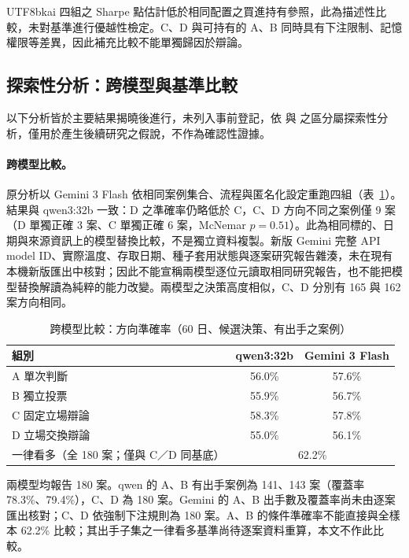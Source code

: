\documentclass[12pt,a4paper]{article}
\newcommand{\grp}[1]{\textsf{#1}}
\begin{document}
\begin{CJK}{UTF8}{bkai}
四組之 Sharpe 點估計低於相同配置之買進持有參照，此為描述性比較，未對基準進行優越性檢定。\grp{C}、\grp{D} 與可持有的 \grp{A}、\grp{B} 同時具有下注限制、記憶權限等差異，因此補充比較不能單獨歸因於辯論。

\subsection{探索性分析：跨模型與基準比較}
\label{sec:exploratory}

以下分析皆於主要結果揭曉後進行，未列入事前登記，依 \citet{wagenmakers2012agenda} 與 \citet{nosek2018prereg} 之區分屬探索性分析，僅用於產生後續研究之假說，不作為確認性證據。

\paragraph{跨模型比較。} 原分析以 Gemini 3 Flash 依相同案例集合、流程與匿名化設定重跑四組（表~\ref{tab:flash}）。結果與 qwen3:32b 一致：\grp{D} 之準確率仍略低於 \grp{C}，\grp{C}、\grp{D} 方向不同之案例僅 9 案（\grp{D} 單獨正確 3 案、\grp{C} 單獨正確 6 案，McNemar $p=0.51$）。此為相同標的、日期與來源資訊上的模型替換比較，不是獨立資料複製。新版 Gemini 完整 API model ID、實際溫度、存取日期、種子套用狀態與逐案研究報告雜湊，未在現有本機新版匯出中核對；因此不能宣稱兩模型逐位元讀取相同研究報告，也不能把模型替換解讀為純粹的能力改變。兩模型之決策高度相似，\grp{C}、\grp{D} 分別有 165 與 162 案方向相同。

\begin{table}[H]
\centering\small
\caption{跨模型比較：方向準確率（60 日、候選決策、有出手之案例）}
\label{tab:flash}
\begin{tabular}{@{}lcc@{}}
\toprule
組別 & qwen3:32b & Gemini 3 Flash \\
\midrule
\grp{A} 單次判斷 & 56.0\% & 57.6\% \\
\grp{B} 獨立投票 & 55.9\% & 56.7\% \\
\grp{C} 固定立場辯論 & 58.3\% & 57.8\% \\
\grp{D} 立場交換辯論 & 55.0\% & 56.1\% \\
\midrule
一律看多（全 180 案；僅與 C／D 同基底） & \multicolumn{2}{c}{62.2\%} \\
\bottomrule
\end{tabular}
\par\smallskip
\raggedright\footnotesize 兩模型均報告 180 案。qwen 的 A、B 有出手案例為 141、143 案（覆蓋率 78.3\%、79.4\%），C、D 為 180 案。Gemini 的 A、B 出手數及覆蓋率尚未由逐案匯出核對；C、D 依強制下注規則為 180 案。A、B 的條件準確率不能直接與全樣本 62.2\% 比較；其出手子集之一律看多基準尚待逐案資料重算，本文不作此比較。
\end{table}


\end{CJK}
\end{document}
